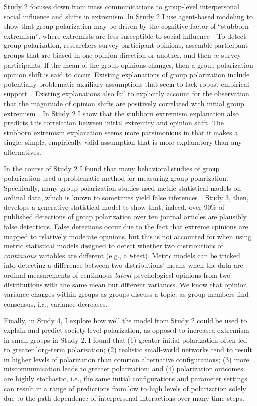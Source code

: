 \documentclass[12pt,letterpaper]{article}
\begin{document}
Study 2 focuses down from
mass communications to group-level interpersonal social influence and shifts in extremism.
In Study 2 I use agent-based modeling to show that group polarization 
may be driven by the cognitive factor of ``stubborn extremism'', where
extremists are less susceptible to social influence~\cite{Reiss2019,Zmigrod2019a}.
To detect group polarization, researchers survey participant
opinions, assemble participant groups that are biased in one opinion direction 
or another, and then re-survey participants. 
If the mean of the group opinions changes, then
a group polarization opinion shift is said to occur. Existing explanations of
group polarization include potentially
problematic axuiliary assumptions that seem to lack robust empirical support~\cite{Meehl1990}.
Existing explanations also fail to explicitly account for the observation that
the magnitude of opinion shifts are positively correlated with initial group
extremism~\cite{Myers1982}. In Study 2 I show that the stubborn extremism explanation
also predicts this correlation between initial extremity and opinion shift.
The stubborn extremism explanation seems more parsimonious in that
it makes a single, simple, empirically valid assumption that is more explanatory
than any alternatives.

In the course of Study 2 I found that many behavioral studies of
group polarization used a problematic method for measuring group polarization.
Specifically, many group polarization studies used metric statistical models
on ordinal data, which is known to sometimes yield false inferences~\cite{Liddell2018}.
Study 3, then, develops a generative statistical model to show that, indeed, over 90\% of 
published detections of group polarization over ten journal articles
are plausibly false detections. 
False detections occur due to the fact that extreme opinions are mapped to
relatively moderate opinions, but this is not accounted for when using 
metric statistical models designed to detect whether two distributions of
\emph{continuous} variables are different (e.g., a \emph{t}-test). Metric
models can be tricked into detecting a difference between two distributions' means when
the data are ordinal measurements of continuous \emph{latent} psychological opinions
from two distributions with the same mean but different variances. We know that
opinion variance changes within groups as groups discuss a topic: as group members
find consensus, i.e., variance decreases.

Finally, in Study 4, I explore how well the
model from Study 2 could be used to explain and predict society-level
polarization, as opposed to increased extremism in small groups in Study 2.
I found that (1) greater initial polarization often led to greater long-term polarization; 
(2) realistic small-world networks tend to result in higher levels of
polarization than common alternative configurations; (3) more miscommunication
leads to greater polarization; and (4) polarization outcomes are
highly stochastic, i.e., the same initial configurations and
parameter settings can result in a range of predictions from low to high
levels of polarization solely due to the path dependence of interpersonal
interactions over many time steps.




\setlength{\bibleftmargin}{.125in}
\setlength{\bibindent}{-\bibleftmargin}


\end{document}
